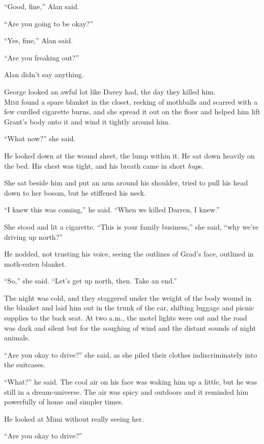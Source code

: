 ``Good, fine,'' Alan said.

``Are you going to be okay?''

``Yes, fine,'' Alan said.

``Are you freaking out?''

Alan didn't say anything.

George looked an awful lot like Davey had, the day they killed him.
\\
\lettrine[lines=3, lhang=.5, nindent=0pt, findent=2pt]{M}{imi} found a spare blanket in the closet, reeking of mothballs and
scarred with a few curdled cigarette burns, and she spread it out on
the floor and helped him lift Grant's body onto it and wind it tightly
around him.

``What now?'' she said.

He looked down at the wound sheet, the lump within it.  He sat down
heavily on the bed.  His chest was tight, and his breath came in short
\textit{hup}s.

She sat beside him and put an arm around his shoulder, tried to pull
his head down to her bosom, but he stiffened his neck.

``I knew this was coming,'' he said.  ``When we killed Darren, I
knew.''

She stood and lit a cigarette.  ``This is your family business,'' she
said, ``why we're driving up north?''

He nodded, not trusting his voice, seeing the outlines of Grad's face,
outlined in moth-eaten blanket.

``So,'' she said.  ``Let's get up north, then.  Take an end.''

The night was cold, and they staggered under the weight of the body
wound in the blanket and laid him out in the trunk of the car,
shifting luggage and picnic supplies to the back seat.  At two a.m.,
the motel lights were out and the road was dark and silent but for the
soughing of wind and the distant sounds of night animals.

``Are you okay to drive?'' she said, as she piled their clothes
indiscriminately into the suitcases.

``What?'' he said.  The cool air on his face was waking him up a
little, but he was still in a dream-universe.  The air was spicy and
outdoors and it reminded him powerfully of home and simpler times.

He looked at Mimi without really seeing her.

``Are you okay to drive?''

